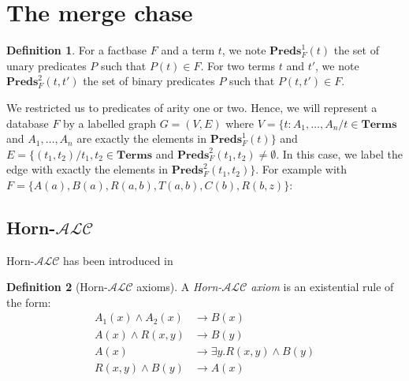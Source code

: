 \documentclass{article}
\theoremstyle{definition}
\newtheorem{definition}{Definition}[section]
\theoremstyle{remark}
\newcommand{\Terms}{\textbf{Terms}}
\newcommand{\Preds}{\textbf{Preds}}
\begin{document}
\section{The merge chase}


\begin{definition}
For a factbase $F$ and a term $t$, we note \emph{$\Preds^1_F(t)$} the set of unary predicates $P$ such that $P(t)\in F$. For two terms $t$ and $t'$, we note \emph{$\Preds^2_F(t,t')$} the set of binary predicates $P$ such that $P(t,t')\in F$.
\end{definition}

We restricted us to predicates of arity one or two. Hence, we will represent a database $F$ by a labelled graph $G = (V,E)$ where $V = \{t:A_1,\ldots,A_n /t \in \Terms$ and $A_1,\ldots,A_n$ are exactly the elements in $\Preds_F^1(t)\}$ and $E = \{(t_1,t_2) /t_1,t_2 \in \Terms$ and $\Preds^2_F(t_1,t_2) \neq \emptyset$. In this case, we label the edge with exactly the elements in $\Preds^2_F(t_1,t_2)\}$. For example with $F = \{A(a), B(a),R(a,b),T(a,b),C(b),R(b,z)\}$: \\



\subsection{Horn-$\mathcal{ALC}$ }

Horn-$\mathcal{ALC}$ has been introduced in \cite{Horn-ALC}

\begin{definition}[Horn-$\mathcal{ALC}$ axioms]
A \emph{Horn-$\mathcal{ALC}$ axiom} is an existential rule of the form:
\begin{align}
A_1(x) \wedge A_2(x) &\rightarrow B(x) \\
A(x) \wedge R(x,y) &\rightarrow B(y) \\
A(x) &\rightarrow \exists y.R(x,y) \wedge B(y) \\
R(x,y) \wedge B(y) &\rightarrow A(x)
\end{align}

\end{definition}
\end{document}
